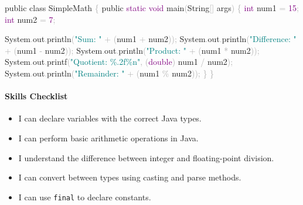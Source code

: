 \documentclass[
  justified,
  openright,
]{tufte-book}
\let\subsubsection\paragraph
\let\paragraph\paragraph
\newcommand{\BuiltInTok}[1]{#1}
\newcommand{\DataTypeTok}[1]{\textcolor{Purple}{#1}}
\newcommand{\DecValTok}[1]{\textcolor{Purple}{#1}}
\newcommand{\FunctionTok}[1]{\textcolor{BrandBlue}{#1}}
\newcommand{\KeywordTok}[1]{\textcolor{BrandBlue}{#1}}
\newcommand{\NormalTok}[1]{#1}
\newcommand{\OperatorTok}[1]{\textcolor{DarkGray}{#1}}
\newcommand{\SpecialCharTok}[1]{\textcolor{Teal}{#1}}
\newcommand{\StringTok}[1]{\textcolor{Teal}{#1}}
\newenvironment{Shaded}{%
  \begin{snugshade}
}{%
  \end{snugshade}
}
\let\subsubsection\paragraph
\let\paragraph\paragraph
\providecommand{\tightlist}{%
  \setlength{\itemsep}{0pt}\setlength{\parskip}{0pt}}
\begin{document}
\begin{Shaded}
\begin{Highlighting}[]
\KeywordTok{public} \KeywordTok{class}\NormalTok{ SimpleMath }\OperatorTok{\{}
    \KeywordTok{public} \DataTypeTok{static} \DataTypeTok{void} \FunctionTok{main}\OperatorTok{(}\BuiltInTok{String}\OperatorTok{[]}\NormalTok{ args}\OperatorTok{)} \OperatorTok{\{}
        \DataTypeTok{int}\NormalTok{ num1 }\OperatorTok{=} \DecValTok{15}\OperatorTok{;}
        \DataTypeTok{int}\NormalTok{ num2 }\OperatorTok{=} \DecValTok{7}\OperatorTok{;}

        \BuiltInTok{System}\OperatorTok{.}\FunctionTok{out}\OperatorTok{.}\FunctionTok{println}\OperatorTok{(}\StringTok{"Sum: "} \OperatorTok{+} \OperatorTok{(}\NormalTok{num1 }\OperatorTok{+}\NormalTok{ num2}\OperatorTok{));}
        \BuiltInTok{System}\OperatorTok{.}\FunctionTok{out}\OperatorTok{.}\FunctionTok{println}\OperatorTok{(}\StringTok{"Difference: "} \OperatorTok{+} \OperatorTok{(}\NormalTok{num1 }\OperatorTok{{-}}\NormalTok{ num2}\OperatorTok{));}
        \BuiltInTok{System}\OperatorTok{.}\FunctionTok{out}\OperatorTok{.}\FunctionTok{println}\OperatorTok{(}\StringTok{"Product: "} \OperatorTok{+} \OperatorTok{(}\NormalTok{num1 }\OperatorTok{*}\NormalTok{ num2}\OperatorTok{));}
        \BuiltInTok{System}\OperatorTok{.}\FunctionTok{out}\OperatorTok{.}\FunctionTok{printf}\OperatorTok{(}\StringTok{"Quotient: }\SpecialCharTok{\%.2f\%n}\StringTok{"}\OperatorTok{,} \OperatorTok{(}\DataTypeTok{double}\OperatorTok{)}\NormalTok{ num1 }\OperatorTok{/}\NormalTok{ num2}\OperatorTok{);}
        \BuiltInTok{System}\OperatorTok{.}\FunctionTok{out}\OperatorTok{.}\FunctionTok{println}\OperatorTok{(}\StringTok{"Remainder: "} \OperatorTok{+} \OperatorTok{(}\NormalTok{num1 }\OperatorTok{\%}\NormalTok{ num2}\OperatorTok{));}
    \OperatorTok{\}}
\OperatorTok{\}}
\end{Highlighting}
\end{Shaded}

\subsubsection{Skills Checklist}\label{skills-checklist-4}

\begin{itemize}
\tightlist
\item[$\square$]
  I can declare variables with the correct Java types.
\item[$\square$]
  I can perform basic arithmetic operations in Java.
\item[$\square$]
  I understand the difference between integer and floating-point
  division.
\item[$\square$]
  I can convert between types using casting and parse methods.
\item[$\square$]
  I can use \texttt{final} to declare constants.
\end{itemize}
\end{document}
